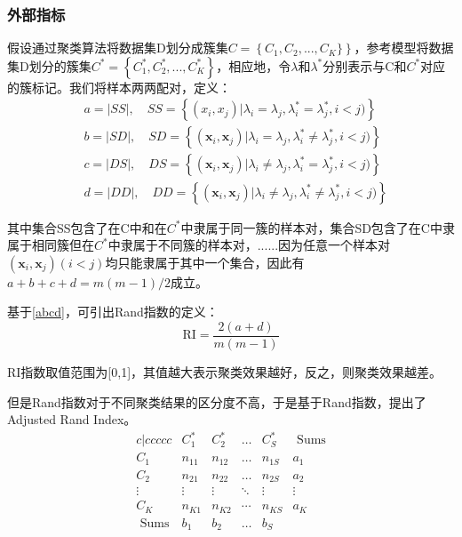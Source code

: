 \subsubsection{外部指标}
假设通过聚类算法将数据集D划分成簇集$C=\left\{C_1,C_2,...,C_K\}\right\}$，参考模型将数据集D划分的簇集$C^*=\left\{ C_{1}^{*},C_{2}^{*},...,C_{K}^{*} \right\} $，相应地，令$\lambda$和$\lambda^{*}$分别表示与C和$C^{*}$对应的簇标记。我们将样本两两配对，定义：
\begin{equation}
\label{abcd}
\begin{aligned}
&\left.a=|S S|, \quad S S=\left\{(x_{i}, x_{j}) | \lambda_{i}=\lambda_{j}, \lambda_{i}^{*}=\lambda_{j}^{*}, i<j)\right\}\\
&\left.b=|S D|, \quad S D=\left\{(\boldsymbol{x}_{i}, \boldsymbol{x}_{j}) | \lambda_{i}=\lambda_{j}, \lambda_{i}^{*} \neq \lambda_{j}^{*}, i<j)\right\}\\
&\left.c=|D S|, \quad D S=\left\{(\boldsymbol{x}_{i}, \boldsymbol{x}_{j}) | \lambda_{i} \neq \lambda_{j}, \lambda_{i}^{*}=\lambda_{j}^{*}, i<j)\right\}\\
&\left.d=|D D|, \quad D D=\left\{(\boldsymbol{x}_{i}, \boldsymbol{x}_{j}) | \lambda_{i} \neq \lambda_{j}, \lambda_{i}^{*} \neq \lambda_{j}^{*}, i<j)\right\}
\end{aligned}
\end{equation}

其中集合SS包含了在C中和在$C^{*}$中隶属于同一簇的样本对，集合SD包含了在C中隶属于相同簇但在$C^{*}$中隶属于不同簇的样本对，......因为任意一个样本对$\left(\boldsymbol{x}_{i}, \boldsymbol{x}_{j}\right)(i<j)$均只能隶属于其中一个集合，因此有$a+b+c+d=m(m-1) / 2$成立。

基于\ref{abcd}，可引出Rand指数的定义：
\begin{equation}
\label{RI}
\mathrm{RI}=\frac{2(a+d)}{m(m-1)}
\end{equation}

RI指数取值范围为[0,1]，其值越大表示聚类效果越好，反之，则聚类效果越差。

但是Rand指数对于不同聚类结果的区分度不高，于是基于Rand指数，提出了Adjusted Rand Index。
\[
\begin{matrix}{c|ccccc}
	&		C_{1}^{*}&		C_{2}^{*}&		\dots&		C_{S}^{*}&		\,\,\text{Sums}\\
	\hline
	C_1&		n_{11}&		n_{12}&		\dots&		n_{1S}&		a_1\\
	C_2&		n_{21}&		n_{22}&		\dots&		n_{2S}&		a_2\\
	\vdots&		\vdots&		\vdots&		\ddots&		\vdots&		\vdots\\
	C_K&		n_{K1}&		n_{K2}&		\cdots&		n_{KS}&		a_K\\
	\,\,\text{Sums}&		b_1&		b_2&		\dots&		b_S&		\\
\end{matrix}
\]


